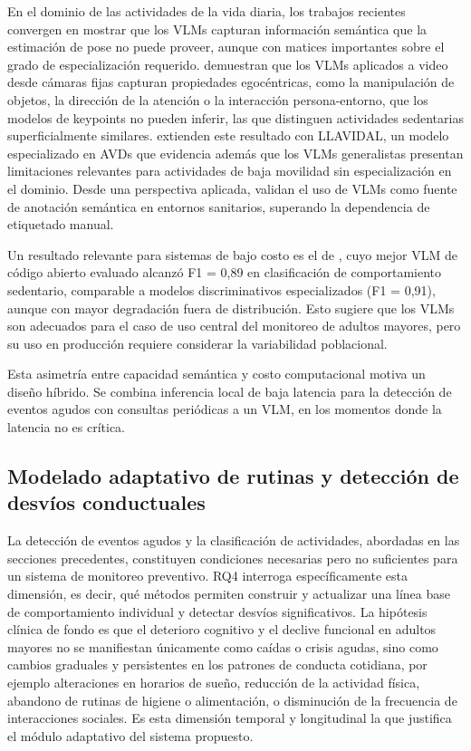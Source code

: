 En el dominio de las actividades de la vida diaria, los trabajos recientes convergen en mostrar que los VLMs capturan información semántica que la estimación de pose no puede proveer, aunque con matices importantes sobre el grado de especialización requerido.
\textcite{Reilly2025a} demuestran que los VLMs aplicados a video desde cámaras fijas capturan propiedades egocéntricas, como la manipulación de objetos, la dirección de la atención o la interacción persona-entorno, que los modelos de keypoints no pueden inferir, las que distinguen actividades sedentarias superficialmente similares.
\textcite{Reilly2025b} extienden este resultado con LLAVIDAL, un modelo especializado en AVDs que evidencia además que los VLMs generalistas presentan limitaciones relevantes para actividades de baja movilidad sin especialización en el dominio.
Desde una perspectiva aplicada, \textcite{Abid2025vlmhar} validan el uso de VLMs como fuente de anotación semántica en entornos sanitarios, superando la dependencia de etiquetado manual.

Un resultado relevante para sistemas de bajo costo es el de \textcite{Schonfeldt2025}, cuyo mejor VLM de código abierto evaluado alcanzó F1 = 0,89 en clasificación de comportamiento sedentario, comparable a modelos discriminativos especializados (F1 = 0,91), aunque con mayor degradación fuera de distribución.
Esto sugiere que los VLMs son adecuados para el caso de uso central del monitoreo de adultos mayores, pero su uso en producción requiere considerar la variabilidad poblacional.

Esta asimetría entre capacidad semántica y costo computacional motiva un diseño híbrido.
Se combina inferencia local de baja latencia para la detección de eventos agudos con consultas periódicas a un VLM, en los momentos donde la latencia no es crítica.

\subsection{Modelado adaptativo de rutinas y detección de desvíos conductuales}
\label{sec:rutinas}

La detección de eventos agudos y la clasificación de actividades, abordadas en las secciones precedentes, constituyen condiciones necesarias pero no suficientes para un sistema de monitoreo preventivo.
RQ4 interroga específicamente esta dimensión, es decir, qué métodos permiten construir y actualizar una línea base de comportamiento individual y detectar desvíos significativos.
La hipótesis clínica de fondo es que el deterioro cognitivo y el declive funcional en adultos mayores no se manifiestan únicamente como caídas o crisis agudas, sino como cambios graduales y persistentes en los patrones de conducta cotidiana, por ejemplo alteraciones en horarios de sueño, reducción de la actividad física, abandono de rutinas de higiene o alimentación, o disminución de la frecuencia de interacciones sociales.
Es esta dimensión temporal y longitudinal la que justifica el módulo adaptativo del sistema propuesto.

